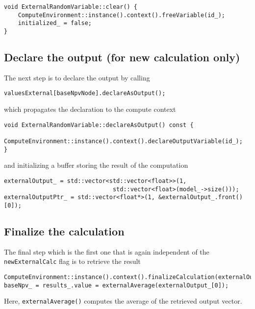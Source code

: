 \documentclass[12pt, a4paper]{article}
\begin{document}
\begin{verbatim}
void ExternalRandomVariable::clear() {
    ComputeEnvironment::instance().context().freeVariable(id_);
    initialized_ = false;
}
\end{verbatim}

\subsection{Declare the output (for new calculation only)}

The next step is to declare the output by calling

\begin{verbatim}
valuesExternal[baseNpvNode].declareAsOutput();
\end{verbatim}

which propagates the declaration to the compute context

\begin{verbatim}
void ExternalRandomVariable::declareAsOutput() const {
    ComputeEnvironment::instance().context().declareOutputVariable(id_);
}
\end{verbatim}

and initializing a buffer storing the result of the computation

\begin{verbatim}
externalOutput_ = std::vector<std::vector<float>>(1,
                               std::vector<float>(model_->size()));
externalOutputPtr_ = std::vector<float*>(1, &externalOutput_.front()[0]);
\end{verbatim}

\subsection{Finalize the calculation}

The final step which is the first one that is again independent of the \verb+newExternalCalc+ flag is to retrieve the result

\begin{verbatim}
ComputeEnvironment::instance().context().finalizeCalculation(externalOutputPtr_);
baseNpv_ = results_.value = externalAverage(externalOutput_[0]);
\end{verbatim}

Here, \verb+externalAverage()+ computes the average of the retrieved output vector.

\end{document}
